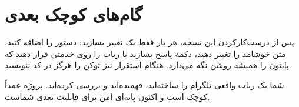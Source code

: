 \section{گام‌های کوچک بعدی}

پس از درست‌کارکردن این نسخه، هر بار فقط یک تغییر بسازید: دستور
را اضافه کنید، متن خوشامد را تغییر دهید، دکمهٔ پاسخ بسازید یا ربات را روی خدمتی
قرار دهید که پایتون را همیشه روشن نگه می‌دارد. هنگام استقرار نیز توکن را هرگز
در کد ننویسید.

\begin{resultbox}
شما یک ربات واقعی تلگرام را ساخته‌اید، فهمیده‌اید و بررسی کرده‌اید. پروژه عمداً
کوچک است و اکنون پایه‌ای امن برای قابلیت بعدی شماست.
\end{resultbox}
